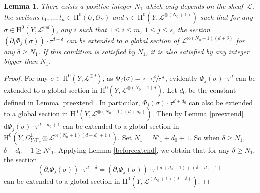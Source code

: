 \documentclass[JEP,XML,SOM,Unicode,published]{cedram}
\theoremstyle{plain}
\newtheorem{lem}[thm]{Lemma}
\theoremstyle{definition}
\newcommand{\ho}{\mathrm{H}}
\newcommand{\li}{\mathcal{L}}
\newcommand{\F}{\mathbb{F}}
\begin{document}
\begin{lem}\label{extend}
There exists a positive integer $N_1$ which only depends on the sheaf~$\li$, the sections $t_1,\dots, t_n\in \ho^0(U, \mathcal{O}_Y)$ and $\tau\in \ho^0(Y, \li^{\otimes (N_0+1)})$ such that for any $\sigma \in \ho^0(Y, \li^{\otimes d})$, any $i$ such that $1\leq i\leq m$, $1\leq j\leq s$, the section $\left(\partial_i \Phi_j(\sigma) \right)\cdot \tau^{d+\delta}$ can be extended to a global section of $\li^{\otimes (N_0+1)(d+\delta)}$ for any $\delta \geq N_1$. If this condition is satisfied by $N_1$, it is also satisfied by any integer bigger than $N_1$.
\end{lem}
\begin{proof}[Proof]
For any $\sigma \in \ho^0(Y, \li^{\otimes d})$, as $\Phi_j(\sigma)=\sfrac{\sigma \cdot \tau_j^d}{\tau^d}$, evidently $\Phi_j(\sigma)\cdot \tau^d$ can be extended to a global section in $\ho^0(Y, \li^{\otimes (N_0+1)d})$. Let $d_0$ be the constant defined in Lemma \ref{preextend}. In particular, $\Phi_j(\sigma)\cdot \tau^{d+d_0}$ can also be extended to a global section in $\ho^0(Y, \li^{\otimes (N_0+1)(d+d_0)})$. Then by Lemma \ref{preextend} $\mathrm{d}\Phi_j(\sigma)\cdot \tau^{d+d_0+1}$ can be extended to a global section in $\ho^0(Y, \Omega_{Y/\F_q}^1\otimes \li^{\otimes (N_0+1)(d+d_0+1)})$.
Set $N_1=N'_1+d_0+1$. So when $\delta\geq N_1$, $\delta-d_0-1\geq N'_1$. Applying Lemma \ref{beforeextend}, we obtain that for any $\delta\geq N_1$, the section\vspace*{-3pt}
\[
\left(\partial_i \Phi_j(\sigma) \right)\cdot \tau^{d+\delta}=\left(\partial_i \Phi_j(\sigma) \right)\cdot \tau^{(d+d_0+1)+(\delta-d_0-1)}
\]
can be extended to a global section in $\ho^0(Y, \li^{(N_0+1)(d+\delta)})$.
\end{proof}
\end{document}
